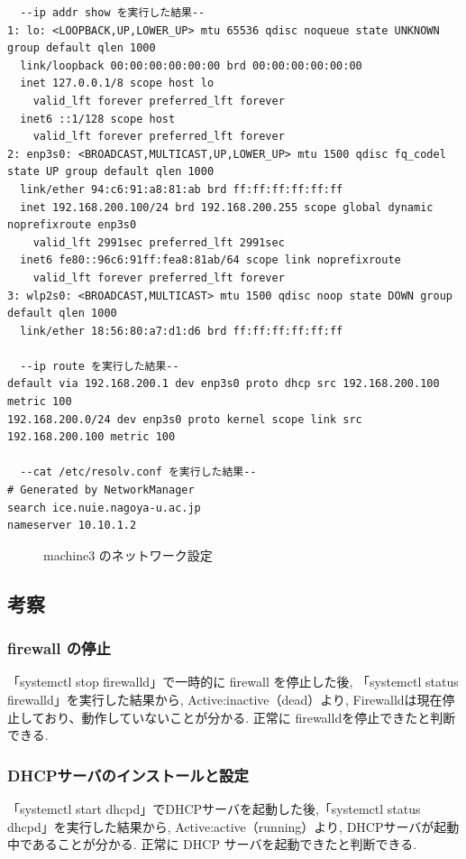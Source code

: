 \documentclass{ltjsarticle} %
\begin{document}
\begin{mdframed}
  \begin{verbatim}
  --ip addr show を実行した結果--
1: lo: <LOOPBACK,UP,LOWER_UP> mtu 65536 qdisc noqueue state UNKNOWN group default qlen 1000
  link/loopback 00:00:00:00:00:00 brd 00:00:00:00:00:00
  inet 127.0.0.1/8 scope host lo
    valid_lft forever preferred_lft forever
  inet6 ::1/128 scope host
    valid_lft forever preferred_lft forever
2: enp3s0: <BROADCAST,MULTICAST,UP,LOWER_UP> mtu 1500 qdisc fq_codel state UP group default qlen 1000
  link/ether 94:c6:91:a8:81:ab brd ff:ff:ff:ff:ff:ff
  inet 192.168.200.100/24 brd 192.168.200.255 scope global dynamic noprefixroute enp3s0
    valid_lft 2991sec preferred_lft 2991sec
  inet6 fe80::96c6:91ff:fea8:81ab/64 scope link noprefixroute
    valid_lft forever preferred_lft forever
3: wlp2s0: <BROADCAST,MULTICAST> mtu 1500 qdisc noop state DOWN group default qlen 1000
  link/ether 18:56:80:a7:d1:d6 brd ff:ff:ff:ff:ff:ff

  --ip route を実行した結果--
default via 192.168.200.1 dev enp3s0 proto dhcp src 192.168.200.100 metric 100
192.168.200.0/24 dev enp3s0 proto kernel scope link src 192.168.200.100 metric 100

  --cat /etc/resolv.conf を実行した結果--
# Generated by NetworkManager
search ice.nuie.nagoya-u.ac.jp
nameserver 10.10.1.2
  \end{verbatim}
  \end{mdframed}
  \begin{figure}[H]
  \caption{machine3 のネットワーク設定}
  \label{fig:machine3}
\end{figure}


\subsection{考察}

\subsubsection{firewall の停止}
「systemctl stop firewalld」で一時的に firewall を停止した後, 
「systemctl status firewalld」を実行した結果から, Active:inactive（dead）より, 
Firewalldは現在停止しており、動作していないことが分かる. 
正常に firewalldを停止できたと判断できる. 

\subsubsection{DHCPサーバのインストールと設定}
「systemctl start dhcpd」でDHCPサーバを起動した後,「systemctl status dhcpd」を実行した結果から, 
Active:active（running）より, DHCPサーバが起動中であることが分かる. 
正常に DHCP サーバを起動できたと判断できる. 
\end{document}
